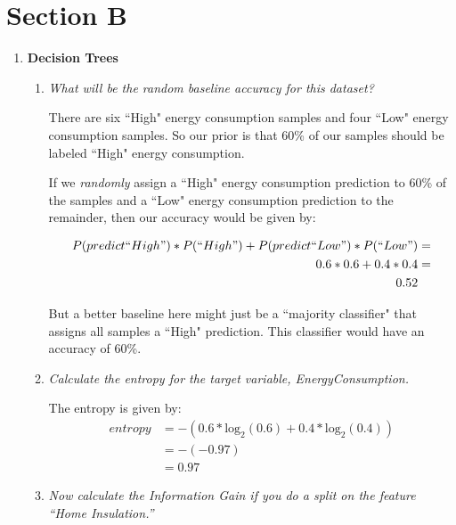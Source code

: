 \documentclass{article}
\begin{document}
\section*{Section B}
\begin{enumerate}
    \item \textbf{Decision Trees}
        \begin{enumerate}
            \item \textit{What will be the random baseline accuracy for this
                dataset?}

                There are six ``High" energy consumption samples and four
                ``Low" energy consumption samples. So our prior is that 60\% of
                our samples should be labeled ``High" energy consumption.

                If we \textit{randomly} assign a ``High" energy consumption
                prediction to 60\% of the samples and a ``Low" energy
                consumption prediction to the remainder, then our accuracy
                would be given by:

                \begin{align*}
                    P(predict ``High") * P(``High") + P(predict ``Low") * P(``Low")
                    &= \\
                    0.6 * 0.6 + 0.4 * 0.4 &= \\
                    0.52
                \end{align*}

                But a better baseline here might just be a ``majority
                classifier" that assigns all samples a ``High" prediction. This
                classifier would have an accuracy of 60\%.

            \item \textit{Calculate the entropy for the target variable,
                EnergyConsumption.}

                The entropy is given by:
                \begin{align*}
                    entropy & = - (0.6 * \text{log}_2(0.6) + 0.4 * \text{log}_2(0.4)) \\
                    & = -(-0.97) \\
                    & = 0.97
                \end{align*}

            \item \textit{Now calculate the Information Gain if you do a split
                on the feature ``Home Insulation.''}


\end{enumerate}
\end{enumerate}
\end{document}
